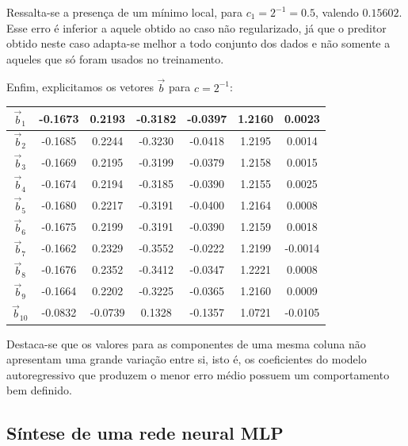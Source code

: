 	\FloatBarrier 
	
	Ressalta-se a presença de um mínimo local, para \(c_1 = 2^{-1} =
	0.5\), valendo \(0.15602\). Esse erro é inferior a aquele obtido
	ao caso não regularizado, já que o preditor obtido
	neste caso adapta-se melhor a todo conjunto dos dados e não somente a aqueles
	que só foram usados no treinamento.
	
	\vspace{12pt}
	
	Enfim, explicitamos os vetores \(\overrightarrow{b}\) para \(c = 2^{-1}\):
	\FloatBarrier
	\begin {table}[H]
\centering
	\begin{tabular} {| c | c | c | c | c | c | c |}
	\hline 
	\( \overrightarrow{b}_1 \) & -0.1673 & 0.2193 & -0.3182 & -0.0397 & 1.2160 & 
	0.0023 \\\hline 
	\( \overrightarrow{b}_2 \) &-0.1685 & 0.2244 & -0.3230 & -0.0418 & 1.2195 &  0.0014
	\\ \hline 
	\( \overrightarrow{b}_3 \) & -0.1669 & 0.2195 & -0.3199 & -0.0379 & 1.2158 & 
	0.0015 \\ \hline 
	\( \overrightarrow{b}_4 \)  &-0.1674 & 0.2194 & -0.3185 & -0.0390 & 1.2155 & 
	0.0025 \\ \hline
	\( \overrightarrow{b}_5 \) & -0.1680 & 0.2217 & -0.3191 & -0.0400 & 1.2164 & 
	0.0008 \\ \hline 
	\( \overrightarrow{b}_6 \) & -0.1675 & 0.2199 & -0.3191 & -0.0390 & 1.2159 & 
	0.0018 \\ \hline 
	\( \overrightarrow{b}_7 \) & -0.1662 & 0.2329 & -0.3552 & -0.0222 & 1.2199 &
	-0.0014 \\ \hline 
	\( \overrightarrow{b}_8 \) & -0.1676 & 0.2352 & -0.3412 & -0.0347 & 1.2221 & 
	0.0008 \\ \hline 
	\( \overrightarrow{b}_9 \) &-0.1664 & 0.2202 & -0.3225 & -0.0365 & 1.2160 & 
	0.0009 \\ \hline 
	\( \overrightarrow{b}_{10} \) & -0.0832 & -0.0739 & 0.1328 & -0.1357 & 1.0721 &
	-0.0105 \\ \hline
	

	\end{tabular} 
\end {table}

Destaca-se que os valores para as componentes de uma mesma coluna não apresentam
uma grande variação entre si, isto é, os coeficientes do modelo autoregressivo
que produzem o menor erro médio possuem um comportamento bem definido.

\subsection{Síntese de uma rede neural MLP}

